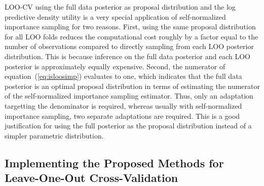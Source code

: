 \documentclass[12pt]{article}
\begin{document}
\begin{appendices}
LOO-CV using the full data posterior as proposal distribution and
the log predictive density utility is a very special application
of self-normalized importance sampling for two reasons.
First, using the same proposal distribution for all LOO folds reduces the computational cost roughly by a factor equal to the number of observations
compared to directly sampling from each LOO posterior distribution. This is because
inference on the full data posterior and each LOO posterior is approximately equally expensive.
Second, the numerator of equation~(\ref{eq:isloosimp}) evaluates to one, which
indicates that the full data posterior is an optimal proposal distribution in terms of estimating the
numerator of the self-normalized importance sampling estimator.
Thus, only an adaptation targetting the denominator is required, whereas usually with
self-normalized importance sampling, two separate adaptations are required.
%
%
%
This is a good justification for using the full posterior as the proposal distribution
instead of a simpler parametric distribution.
%
%
%
%
%
%













\subsection{Implementing the Proposed Methods for Leave-One-Out Cross-Validation}









\end{appendices}
\end{document}
